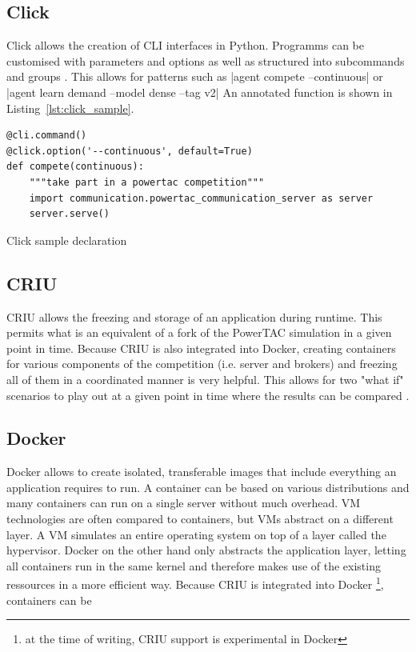 \subsection{Click}%
\label{sub:click}

Click allows the creation of CLI interfaces in Python. Programms can be customised with parameters and options as well
as structured into subcommands and groups \citep{clickcli}. This allows for patterns such as |agent compete
--continuous| or |agent learn demand --model dense --tag v2| An annotated function is shown in
Listing~\ref{lst:click_sample}.

\begin{listing}[h]
\begin{verbatim}
@cli.command()
@click.option('--continuous', default=True)
def compete(continuous):
    """take part in a powertac competition"""
    import communication.powertac_communication_server as server
    server.serve()
\end{verbatim}
\caption{Click sample declaration}
\label{lst:click_sample}
\end{listing}

\subsection{CRIU}%
\label{sub:criu}
\ac{CRIU} allows the freezing and storage of an application during runtime. This permits what is an equivalent of a fork
of the \ac {PowerTAC} simulation in a given point in time. Because \ac{CRIU} is also integrated into Docker, creating
containers for various components of the competition (i.e. server and brokers) and freezing all of them in a coordinated
manner is very helpful. This allows for two "what if" scenarios to play out at a given point in time where the results
can be compared \citep{criu}.

\subsection{Docker}%
\label{sub:docker}

Docker allows to create isolated, transferable images that include everything an application requires to run. A
container can be based on various distributions and many containers can run on a single server without much overhead.
\ac{VM} technologies are often compared to containers, but \ac{VM}s abstract on a different layer. A \ac{VM} simulates
an entire operating system on top of a layer called the hypervisor. Docker on the other hand only abstracts the
application layer, letting all containers run in the same kernel and therefore makes use of the existing ressources in a
more efficient way. Because \ac{CRIU} is integrated into Docker
\footnote{at the time of writing, CRIU support is experimental in Docker},
containers can be 


